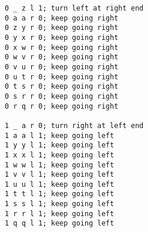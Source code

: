\begin{verbatim}
0 _ z l 1; turn left at right end
0 a a r 0; keep going right
0 z y r 0; keep going right
0 y x r 0; keep going right
0 x w r 0; keep going right
0 w v r 0; keep going right
0 v u r 0; keep going right
0 u t r 0; keep going right
0 t s r 0; keep going right
0 s r r 0; keep going right
0 r q r 0; keep going right

1 _ a r 0; turn right at left end
1 a a l 1; keep going left
1 y y l 1; keep going left
1 x x l 1; keep going left
1 w w l 1; keep going left
1 v v l 1; keep going left
1 u u l 1; keep going left
1 t t l 1; keep going left
1 s s l 1; keep going left
1 r r l 1; keep going left
1 q q l 1; keep going left
\end{verbatim}